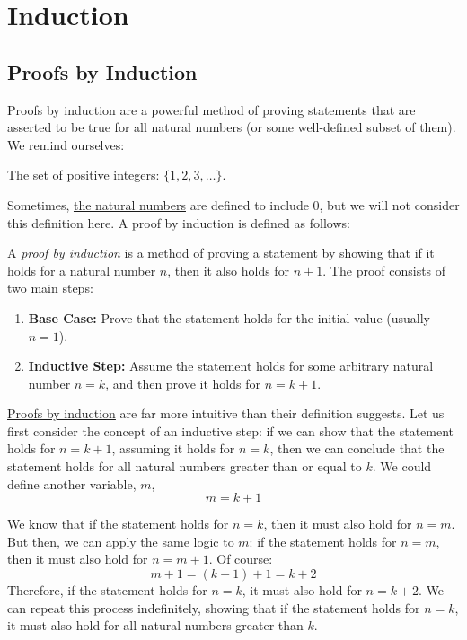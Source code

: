 \chapter{Induction}
\section{Proofs by Induction}

Proofs by induction are a powerful method of proving statements 
that are asserted to be true for all natural numbers (or some well-defined subset
of them). We remind ourselves:

\begin{definition}\label{def:natural-numbers}
    The set of positive integers: $\{1, 2, 3, \ldots\}$.
\end{definition}

Sometimes, \hyperref[def:natural-numbers]{the natural numbers} are defined to include 0,
but we will not consider this definition here. A proof by induction is defined as follows:

\begin{definition}\label{def:proof-by-induction}
    A \textit{proof by induction} is a method of proving a statement by showing that if it holds for a natural number $n$, then it also holds for $n+1$. The proof consists of two main steps:
    \begin{enumerate}
        \item \textbf{Base Case:} Prove that the statement holds for the initial value (usually $n=1$).
        \item \textbf{Inductive Step:} Assume the statement holds for some arbitrary natural number $n=k$, and then prove it holds for $n=k+1$.
    \end{enumerate}
\end{definition}

\hyperref[def:proof-by-induction]{Proofs by induction} are far more intuitive than their definition suggests. Let us
first consider the concept of an inductive step: if we can show that the statement holds for $n=k+1$,
assuming it holds for $n=k$, then we can conclude that the statement holds for all natural numbers greater than or equal to $k$.
We could define another variable, $m$,
\begin{equation*}
    m = k + 1
\end{equation*}

We know that if the statement holds for $n=k$, then it must also hold for $n=m$. But then, we can apply the same logic to $m$:
if the statement holds for $n=m$, then it must also hold for $n=m+1$. Of course:
\begin{equation*}
    m + 1 = (k + 1) + 1 = k + 2
\end{equation*}
Therefore, if the statement holds for $n=k$, it must also hold for $n=k+2$. We can repeat this process indefinitely, showing that
if the statement holds for $n=k$, it must also hold for all natural numbers greater than $k$.

